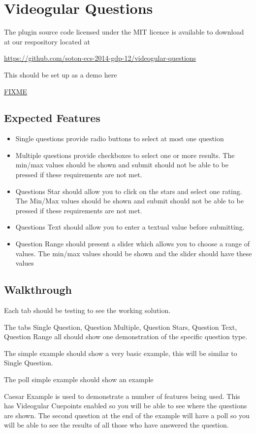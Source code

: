 \documentclass[12pt,a4paper]{article}
\begin{document}
\section*{Videogular Questions}

The plugin source code licensed under the MIT licence is available to download at our respository located at 

\url{https://github.com/soton-ecs-2014-gdp-12/videogular-questions}

This should be set up as a demo here

\url{FIXME}

\subsection*{Expected Features}

\begin{itemize}
\item Single questions provide radio buttons to select at most one question
\item Multiple questions provide checkboxes to select one or more results. The min/max values should be shown and submit should not be able to be pressed if these requirements are not met.
\item Questions Star should allow you to click on the stars and select one rating. The Min/Max values should be shown and submit should not be able to be pressed if these requirements are not met.
\item Questions Text should allow you to enter a textual value before submitting.
\item Question Range should present a slider which allows you to choose a range of values. The min/max values should be shown and the slider should have these values
\end{itemize}

\subsection*{Walkthrough}

Each tab should be testing to see the working solution.

The tabs Single Question, Question Multiple, Question Stars, Question Text, Question Range all should show one demonstration of the specific question type.

The simple example should show a very basic example, this will be similar to Single Question.

The poll simple example should show an example 

Caesar Example is used to demonstrate a number of features being used. This has Videogular Cuepoints enabled so you will be able to see where the questions are shown. The second question at the end of the example will have a poll so you will be able to see the results of all those who have answered the question.
\end{document}
